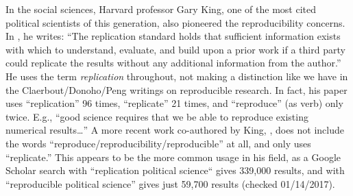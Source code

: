 \documentclass{statement}
\newlength{\up}
\begin{document}
In the social sciences, Harvard professor Gary King, one of the most cited political scientists of this generation, also pioneered the reproducibility concerns. 
In \cite{king1995}, he writes: ``The replication standard holds that sufficient information exists with which to understand, evaluate, and build upon a prior work if a third party could replicate the results without any additional information from the author.'' He uses the term \emph{replication} throughout, not making a distinction like we have in the Claerbout/Donoho/Peng writings on reproducible research. 
In fact, his paper uses ``replication'' 96 times, ``replicate'' 21 times, and ``reproduce'' (as verb) only twice. E.g., ``good science requires that we be able to reproduce existing numerical results\ldots''
A more recent work co-authored by King, \cite[]{lazerETal2014}, does not include the words ``reproduce/reproducibility/reproducible'' at all, and only uses ``replicate.'' 
This appears to be the more common usage in his field, as a Google Scholar search with ``replication political science`` gives 339,000 results, and with ``reproducible political science'' gives just 59,700 results (checked 01/14/2017).













\end{document}
